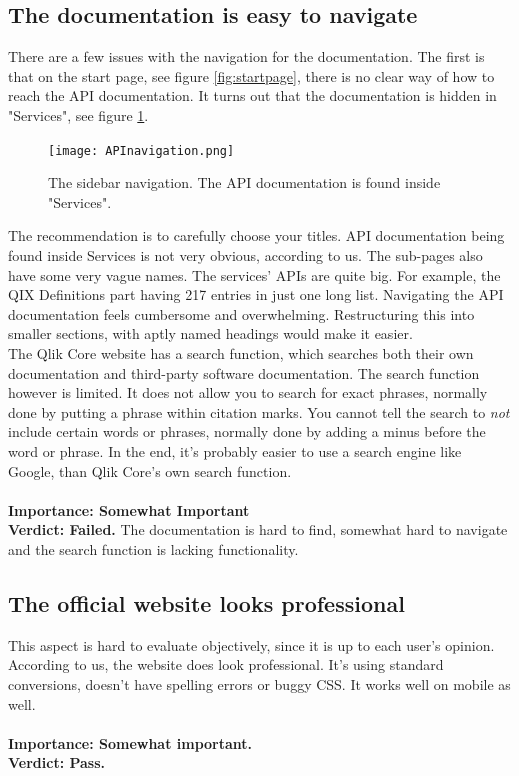 \documentclass{cslthse-msc}
\begin{document}
    \subsection{The documentation is easy to navigate}
    There are a few issues with the navigation for the documentation. The first is that on the start page, see figure \ref{fig:startpage}, there is no clear way of how to reach the API documentation. It turns out that the documentation is hidden in "Services", see figure \ref{fig:navgiation}.
    \begin{figure}[H]
        \centering
        \texttt{[image: APInavigation.png]}
        \caption{The sidebar navigation. The API documentation is found inside "Services".}
        \label{fig:navgiation}
    \end{figure}
    The recommendation is to carefully choose your titles. API documentation being found inside Services is not very obvious, according to us. The sub-pages also have some very vague names. The services' APIs are quite big. For example, the QIX Definitions part having 217 entries in just one long list. Navigating the API documentation feels cumbersome and overwhelming. Restructuring this into smaller sections, with aptly named headings would make it easier.\\
    The Qlik Core website has a search function, which searches both their own documentation and third-party software documentation. The search function however is limited. It does not allow you to search for exact phrases, normally done by putting a phrase within citation marks. You cannot tell the search to \textit{not} include certain words or phrases, normally done by adding a minus before the word or phrase. In the end, it's probably easier to use a search engine like Google, than Qlik Core's own search function.\\\\
    \textbf{Importance: Somewhat Important}\\
    \textbf{Verdict: Failed.} The documentation is hard to find, somewhat hard to navigate and the search function is lacking functionality.
    \subsection{The official website looks professional}
    This aspect is hard to evaluate objectively, since it is up to each user's opinion. According to us, the website does look professional. It's using standard conversions, doesn't have spelling errors or buggy CSS. It works well on mobile as well.\\ \\
    \textbf{Importance: Somewhat important.}\\
    \textbf{Verdict: Pass.}
\end{document}
